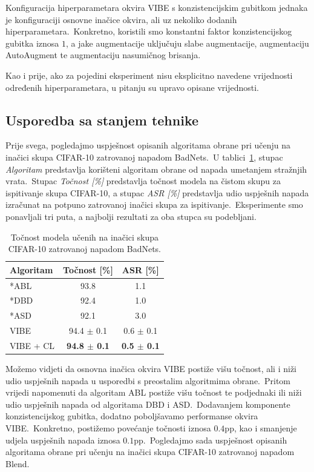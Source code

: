\documentclass[diplomskirad]{fer}
\begin{document}
Konfiguracija hiperparametara okvira VIBE s konzistencijskim gubitkom jednaka je konfiguraciji osnovne inačice okvira, ali uz nekoliko dodanih hiperparametara.\ 
Konkretno, koristili smo konstantni faktor konzistencijskog gubitka iznosa $1$, a jake augmentacije uključuju slabe augmentacije, augmentaciju AutoAugment te augmentaciju nasumičnog brisanja.\ 

Kao i prije, ako za pojedini eksperiment nisu eksplicitno navedene vrijednosti određenih hiperparametara, u pitanju su upravo opisane vrijednosti.\ 

\subsection{Usporedba sa stanjem tehnike}
\label{sub:usporedba_napadi}

Prije svega, pogledajmo uspješnost opisanih algoritama obrane pri učenju na inačici skupa CIFAR-10 zatrovanoj napadom BadNets.\ 
U tablici~\ref{tbl:usporedba_badnets}, stupac \textit{Algoritam} predstavlja korišteni algoritam obrane od napada umetanjem stražnjih vrata.\ 
Stupac \textit{Točnost [\%]} predstavlja točnost modela na čistom skupu za ispitivanje skupa CIFAR-10, a stupac \textit{ASR [\%]} predstavlja udio uspješnih napada izračunat na potpuno zatrovanoj inačici skupa za ispitivanje.\ 
Eksperimente smo ponavljali tri puta, a najbolji rezultati za oba stupca su podebljani.\ 

\begin{table}[htb]
  \caption{Točnost modela učenih na inačici skupa CIFAR-10 zatrovanoj napadom BadNets.}
  \label{tbl:usporedba_badnets}
  \centering
  \begin{tabular}{l||cc}
  Algoritam & Točnost [\%] & ASR [\%]\\ \hline \hline
  *ABL & 93.8 & 1.1 \\
  *DBD & 92.4 & 1.0 \\
  *ASD & 92.1 & 3.0 \\ \hline
  VIBE & 94.4 $\pm$ 0.1 & 0.6 $\pm$ 0.1 \\
  VIBE + CL & \textbf{94.8 $\pm$ 0.1} & \textbf{0.5 $\pm$ 0.1} \\
  \end{tabular}
\end{table}

\pagebreak

Možemo vidjeti da osnovna inačica okvira VIBE postiže višu točnost, ali i niži udio uspješnih napada u usporedbi s preostalim algoritmima obrane.\ 
Pritom vrijedi napomenuti da algoritam ABL postiže višu točnost te podjednaki ili niži udio uspješnih napada od algoritama DBD i ASD.\ 
Dodavanjem komponente konzistencijskog gubitka, dodatno poboljšavamo performanse okvira VIBE.\ Konkretno, postižemo povećanje točnosti iznosa $0.4$pp, kao i smanjenje udjela uspješnih napada iznosa $0.1$pp.\ 
Pogledajmo sada uspješnost opisanih algoritama obrane pri učenju na inačici skupa CIFAR-10 zatrovanoj napadom Blend.\ 
\end{document}
